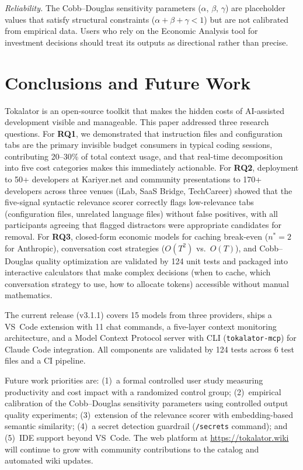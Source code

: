\documentclass[a4paper,fleqn]{cas-dc}
\begin{document}
\textit{Reliability.} The Cobb–Douglas sensitivity parameters ($\alpha$, $\beta$, $\gamma$) are placeholder values that satisfy structural constraints ($\alpha + \beta + \gamma < 1$) but are not calibrated from empirical data. Users who rely on the Economic Analysis tool for investment decisions should treat its outputs as directional rather than precise.



\section{Conclusions and Future Work}
\label{sec:conclusions}


Tokalator is an open-source toolkit that makes the hidden costs of AI-assisted development visible and manageable. This paper addressed three research questions. For \textbf{RQ1}, we demonstrated that instruction files and configuration tabs are the primary invisible budget consumers in typical coding sessions, contributing 20–30\% of total context usage, and that real-time decomposition into five cost categories makes this immediately actionable. For \textbf{RQ2}, deployment to 50+ developers at Kariyer.net and community presentations to 170+ developers across three venues (iLab, SaaS Bridge, TechCareer) showed that the five-signal syntactic relevance scorer correctly flags low-relevance tabs (configuration files, unrelated language files) without false positives, with all participants agreeing that flagged distractors were appropriate candidates for removal. For \textbf{RQ3}, closed-form economic models for caching break-even ($n^* = 2$ for Anthropic), conversation cost strategies ($O(T^2)$ vs.\ $O(T)$), and Cobb–Douglas quality optimization are validated by 124 unit tests and packaged into interactive calculators that make complex decisions (when to cache, which conversation strategy to use, how to allocate tokens) accessible without manual mathematics.

The current release (v3.1.1) covers 15 models from three providers, ships a VS~Code extension with 11 chat commands, a five-layer context monitoring architecture, and a Model Context Protocol server with CLI (\texttt{tokalator-mcp}) for Claude Code integration. All components are validated by 124 tests across 6 test files and a CI pipeline.

Future work priorities are: (1)~a formal controlled user study measuring productivity and cost impact with a randomized control group; (2)~empirical calibration of the Cobb–Douglas sensitivity parameters using controlled output quality experiments; (3)~extension of the relevance scorer with embedding-based semantic similarity; (4)~a secret detection guardrail (\texttt{/secrets} command); and (5)~IDE support beyond VS~Code. The web platform at \url{https://tokalator.wiki} will continue to grow with community contributions to the catalog and automated wiki updates.
\end{document}
